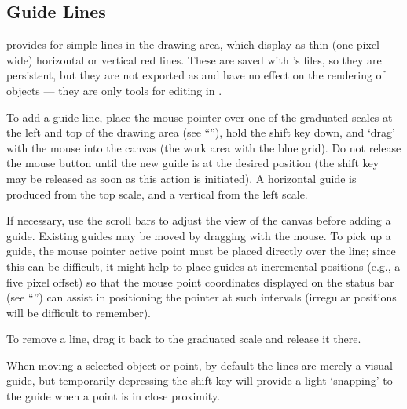 		\subsection{Guide Lines}%
		\label{ssec:guide_lines}
		\IXpkgu{} provides for simple  lines
		in the drawing area, which display as thin
		(one pixel wide) horizontal or vertical
		red lines. These are saved with \IXpkg{}'s
		files, so they are persistent, but they are
		not exported as  and have no effect
		on the rendering of objects --- they are only
		tools for editing in \IXpkg{}.
		
		To add a guide line, place the mouse pointer
		over one of the graduated scales at the left
		and top of the drawing area
		(see ``''),
		hold the shift key
		down, and `drag' with the mouse into the canvas
		(the work area with the blue grid). Do not release
		the mouse button until the new guide is at the
		desired position (the shift key may be released
		as soon as this action is initiated). A horizontal
		guide is produced from the top scale, and a vertical
		 from the left scale.
		
		If necessary, use the scroll bars to adjust the
		view of the canvas before adding a guide. Existing guides
		may be moved by dragging with the mouse. To
		pick up a guide, the mouse pointer active point
		must be placed directly over the line; since this
		can be difficult, it might help to place guides
		at incremental positions (e.g., a five pixel offset)
		so that the mouse point coordinates displayed on the
		status bar (see ``'')
		can assist in positioning the pointer at such
		intervals (irregular positions will be difficult
		to remember).
		
		To remove a  line, drag it back to the
		graduated scale and release it there.
		
		When moving a selected object or point, by default
		the  lines are merely a visual guide,
		but temporarily depressing the shift key will
		provide a light `snapping' to the guide when a
		point is in close proximity.
















